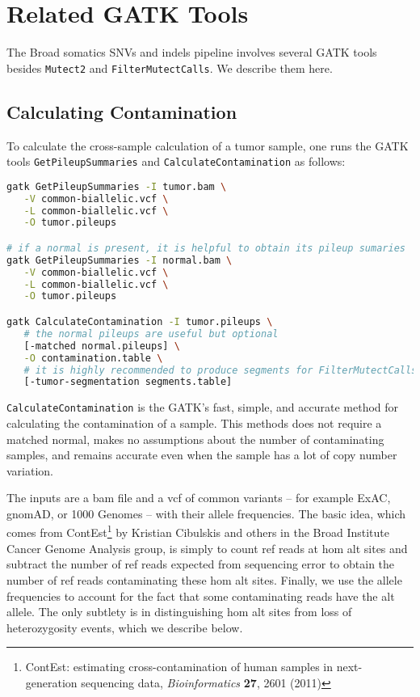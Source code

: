 \documentclass[nofootinbib,amssymb,amsmath]{revtex4}
\newcommand{\code}[1]{\texttt{#1}}
\begin{document}
\section{Related GATK Tools}
The Broad somatics SNVs and indels pipeline involves several GATK tools besides \code{Mutect2} and \code{FilterMutectCalls}.  We describe them here.


\subsection{Calculating Contamination}
To calculate the cross-sample calculation of a tumor sample, one runs the GATK tools \code{GetPileupSummaries} and \code{CalculateContamination} as follows:

\begin{lstlisting}[language=bash,caption={Mutect2 command}, label={cmd-mutect2}]
gatk GetPileupSummaries -I tumor.bam \
   -V common-biallelic.vcf \
   -L common-biallelic.vcf \
   -O tumor.pileups

# if a normal is present, it is helpful to obtain its pileup sumaries
gatk GetPileupSummaries -I normal.bam \
   -V common-biallelic.vcf \
   -L common-biallelic.vcf \
   -O tumor.pileups

gatk CalculateContamination -I tumor.pileups \
   # the normal pileups are useful but optional
   [-matched normal.pileups] \
   -O contamination.table \
   # it is highly recommended to produce segments for FilterMutectCalls
   [-tumor-segmentation segments.table]
\end{lstlisting}

\code{CalculateContamination} is the GATK's fast, simple, and accurate method for calculating the contamination of a sample.  This methods does not require a matched normal, makes no assumptions about the number of contaminating samples, and remains accurate even when the sample has a lot of copy number variation.

The inputs are a bam file and a vcf of common variants -- for example ExAC, gnomAD, or 1000 Genomes -- with their allele frequencies.  The basic idea, which comes from ContEst\footnote{ContEst: estimating cross-contamination of human samples in next-generation sequencing data, \textit{Bioinformatics} \textbf{27}, 2601 (2011)} by Kristian Cibulskis and others in the Broad Institute Cancer Genome Analysis group, is simply to count ref reads at hom alt sites and subtract the number of ref reads expected from sequencing error to obtain the number of ref reads contaminating these hom alt sites.  Finally, we use the allele frequencies to account for the fact that some contaminating reads have the alt allele.  The only subtlety is in distinguishing hom alt sites from loss of heterozygosity events, which we describe below.
\end{document}
